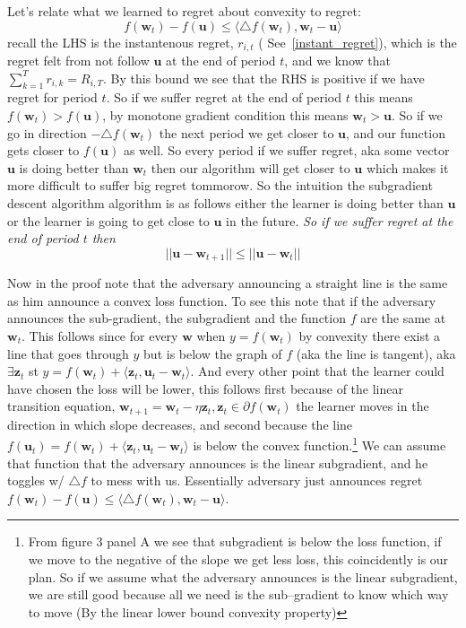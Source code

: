 \documentclass[11pt]{article}
\theoremstyle{quest}
\begin{document}
Let's relate what we learned to regret about convexity to regret: 
$$f(\mathbf{w}_t)-f(\mathbf{u})\le  \langle \triangle f(\mathbf{w}_t), \mathbf{w}_t-\mathbf{u}\rangle $$
recall the LHS is the instantenous regret, $r_{i,t} $ ({ \color{blue} See~\ref{instant_regret}}), which is the regret felt from not follow $\mathbf{u}$ at the end of period $t$, and we know that $\sum_{k=1}^T r_{i,k}=R_{i,T}$. By this bound we see that the RHS is positive if we have regret for period $t$. So if we suffer regret at the end of period $t$ this means $f(\mathbf{w}_t)>f(\mathbf{u})$, by monotone gradient condition this means $\mathbf{w}_t>\mathbf{u}$. So if we go in direction $-\triangle f(\mathbf{w}_t)$ the next period we get closer to $\mathbf{u}$, and our function gets closer to $f(\mathbf{u})$ as well. So every period if we suffer regret, aka some vector $\mathbf{u}$ is doing better than $\mathbf{w}_t$ then our algorithm will get closer to $\mathbf{u}$ which makes it more difficult to suffer big regret tommorow. So the intuition the subgradient descent  algorithm algorithm is as follows either the learner is doing better than $\mathbf{u}$ or the learner is going to get close to $\mathbf{u}$ in the future. \textit{So if we suffer regret at the end of period $t$ then} $$||\mathbf{u}-\mathbf{w}_{t+1}||\le  ||\mathbf{u}-\mathbf{w}_{t}||$$

Now in the proof note that the adversary announcing a straight line is the same as him announce a convex loss function. To see this note that if the adversary announces the sub-gradient, the subgradient and the function $f$ are the same at $\mathbf{w}_t$. This follows since for every $\mathbf{w}$ when $y=f(\mathbf{w}_t)$ by convexity there exist a line that goes through $y$ but is below the graph of $f$ (aka the line is tangent), aka $\exists \mathbf{z}_{t}$ st $y = f(\mathbf{w}_t)+\langle \mathbf{z}_{t},\mathbf{u}_{t}-\mathbf{w}_{t}\rangle$. And every other point that the learner could have chosen the loss will be lower, this follows first because of the linear transition equation,  $\mathbf{w}_{t+1}=\mathbf{w}_{t}-\eta \mathbf{z}_{t}, \mathbf{z}_{t} \in \partial f(\mathbf{w}_t)$ the learner moves in the direction in which slope decreases, and second because the line $f(\mathbf{u}_{t})=f(\mathbf{w}_{t})+\langle \mathbf{z}_{t},\mathbf{u}_{t}-\mathbf{w}_{t}\rangle$ is below the convex function.\footnote{From figure 3 panel A we see that subgradient is below the loss function, if we move to the negative of the slope we get less loss, this coincidently is our plan. So if we assume what the adversary announces is the linear subgradient, we are still good because all we need is the sub--gradient to know which way to move (By the linear lower bound convexity property)}  We can assume that function that the adversary announces is the linear subgradient, and he toggles w/ $\triangle f$ to mess with us. Essentially adversary just announces regret $f(\mathbf{w}_t)-f(\mathbf{u})\le  \langle \triangle f(\mathbf{w}_t), \mathbf{w}_t-\mathbf{u}\rangle $. 
\end{document}
